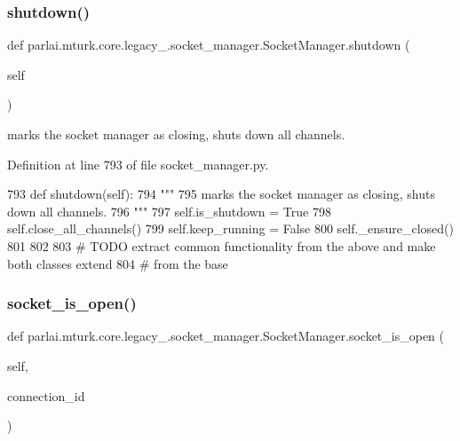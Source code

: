 \subsubsection{\texorpdfstring{shutdown()}{shutdown()}}
{\footnotesize\ttfamily def parlai.\+mturk.\+core.\+legacy\+\_.\+socket\+\_\+manager.\+Socket\+Manager.\+shutdown (\begin{DoxyParamCaption}\item[{}]{self }\end{DoxyParamCaption})}

\begin{DoxyVerb}marks the socket manager as closing, shuts down all channels.
\end{DoxyVerb}
 

Definition at line 793 of file socket\+\_\+manager.\+py.


\begin{DoxyCode}
793     \textcolor{keyword}{def }shutdown(self):
794         \textcolor{stringliteral}{"""}
795 \textcolor{stringliteral}{        marks the socket manager as closing, shuts down all channels.}
796 \textcolor{stringliteral}{        """}
797         self.is\_shutdown = \textcolor{keyword}{True}
798         self.close\_all\_channels()
799         self.keep\_running = \textcolor{keyword}{False}
800         self.\_ensure\_closed()
801 
802 
803 \textcolor{comment}{# TODO extract common functionality from the above and make both classes extend}
804 \textcolor{comment}{# from the base}
\end{DoxyCode}
\mbox{\label{classparlai_1_1mturk_1_1core_1_1legacy__2018_1_1socket__manager_1_1SocketManager_a8fa0c55682c0eb89ba4f4d7dcfd9fdba}} 
\subsubsection{\texorpdfstring{socket\+\_\+is\+\_\+open()}{socket\_is\_open()}}
{\footnotesize\ttfamily def parlai.\+mturk.\+core.\+legacy\+\_.\+socket\+\_\+manager.\+Socket\+Manager.\+socket\+\_\+is\+\_\+open (\begin{DoxyParamCaption}\item[{}]{self,  }\item[{}]{connection\+\_\+id }\end{DoxyParamCaption})}



